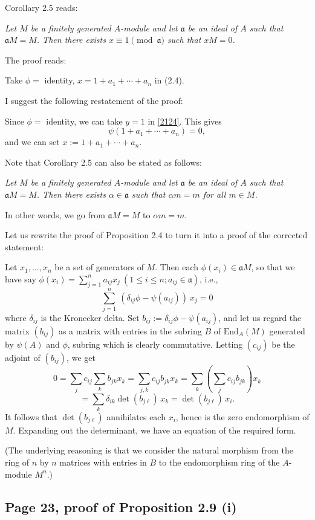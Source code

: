 \documentclass[parskip=half,fontsize=12pt]{scrartcl}%
\newcommand{\mf}{\mathfrak}
\newcommand{\aaa}{\mf a}
\begin{document}
Corollary 2.5 reads:

\emph{Let $M$ be a finitely generated $A$-module and let $\aaa$ be an ideal of $A$ such that $\aaa M=M$. Then there exists $x\equiv1\pmod{\aaa}$ such that $xM=0$.}

The proof reads:

Take $\phi=$ identity, $x=1+a_1+\cdots+a_n$ in (2.4).

I suggest the following restatement of the proof:

Since $\phi=$ identity, we can take $y=1$ in \eqref{2124}. This gives 
$$
\psi(1+a_1+\cdots+a_n)=0,
$$ 
and we can set $x:=1+a_1+\cdots+a_n$.

Note that Corollary 2.5 can also be stated as follows:

\emph{Let $M$ be a finitely generated $A$-module and let $\aaa$ be an ideal of $A$ such that $\aaa M=M$. Then there exists $\alpha\in\aaa$ such that $\alpha m=m$ for all $m\in M$.}

In other words, we go from $\aaa M=M$ to $\alpha m=m$.

Let us rewrite the proof of Proposition 2.4 to turn it into a proof of the corrected statement:%

Let $x_1,\dots,x_n$ be a set of generators of $M$. Then each $\phi(x_i)\in\aaa M$, so that we have say $\phi(x_i)=\sum_{j=1}^na_{ij}x_j\ (1\le i\le n; a_{ij}\in\aaa)$, i.e., 
$$
\sum_{j=1}^n\ (\delta_{ij}\phi-\psi(a_{ij}))\ x_j=0
$$ 
where $\delta_{ij}$ is the Kronecker delta. Set $b_{ij}:=\delta_{ij}\phi-\psi(a_{ij})$, and let us regard the matrix $(b_{ij})$ as a matrix with entries in the subring $B$ of $\text{End}_A(M)$ generated by $\psi(A)$ and $\phi$, subring which is clearly commutative. Letting $(c_{ij})$ be the adjoint of $(b_{ij})$, we get 
$$
0=\sum_jc_{ij}\sum_kb_{jk}x_k=\sum_{j,k}c_{ij}b_{jk}x_k=\sum_k\left(\sum_jc_{ij}b_{jk}\right)x_k
$$ 
$$
=\sum_k\delta_{ik}\det(b_{j\ell})\,x_k=\det(b_{j\ell})\,x_i.
$$ %
It follows that $\det(b_{j\ell})$ annihilates each $x_i$, hence is the zero endomorphism of $M$. Expanding out the determinant, we have an equation of the required form.

(The underlying reasoning is that we consider the natural morphism from the ring of $n$ by $n$ matrices with entries in $B$ to the endomorphism ring of the $A$-module $M^n$.)

\subsection{Page 23, proof of Proposition 2.9 (i)}%
\end{document}
